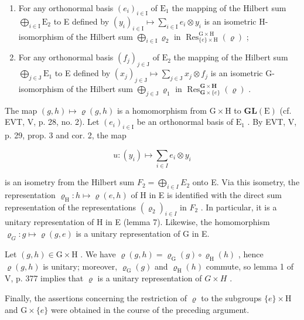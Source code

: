 \begin{enumerate}
\def\labelenumi{\alph{enumi})}
\setcounter{enumi}{1}
\item
  For any orthonormal basis \((e_i)_{i\in \mathrm{I}}\) of \(\mathrm{E}_1\) the mapping of the Hilbert sum \(\bigoplus_{i\in \mathrm{I}}\mathrm{E}_2\) to E defined by \((y_i)_{i\in \mathrm{I}}\mapsto \sum_{i\in \mathrm{I}}e_i\otimes y_i\) is an isometric H-isomorphism of the Hilbert sum \(\bigoplus_{i\in \mathrm{I}}\varrho_2\) in \(\operatorname {Res}_{\{e\} \times \mathrm{H}}^{\mathrm{G}\times \mathrm{H}}(\varrho)\) ;
\item
  For any orthonormal basis \((f_j)_{j\in \mathrm{J}}\) of \(\mathrm{E}_2\) the mapping of the Hilbert sum \(\bigoplus_{j\in \mathrm{J}}\mathrm{E}_1\) to E defined by \((x_{j})_{j\in \mathrm{J}}\mapsto \sum_{j\in \mathrm{J}}x_{j}\otimes f_{j}\) is an isometric G-isomorphism of the Hilbert sum \(\bigoplus_{j\in \mathrm{J}}\varrho_1\) in \(\operatorname {Res}_{\mathbf{G}\times \{e\}}^{\mathbf{G}\times \mathbf{H}}(\varrho)\) .
\end{enumerate}

The map \((g,h)\mapsto\varrho(g,h)\) is a homomorphism from \(\mathrm{G}\times\mathrm{H}\) to \(\mathbf{GL}(\mathrm{E})\) (cf. EVT, V, p. 28, no. 2). Let \((e_{i})_{i\in\mathrm{I}}\) be an orthonormal basis of \(\mathrm{E}_{1}\) . By EVT, V, p. 29, prop. 3 and cor. 2, the map

\[
u \colon (y _ {i}) \mapsto \sum_ {i \in I} e _ {i} \otimes y _ {i}
\]

is an isometry from the Hilbert sum \(F_{2} = \bigoplus_{i \in I} E_{2}\) onto E. Via this isometry, the representation \(\varrho_{\mathrm{H}} \colon h \mapsto \varrho(e, h)\) of H in E is identified with the direct sum representation of the representations \((\varrho_{2})_{i\in I}\) in \(F_{2}\) . In particular, it is a unitary representation of H in E (lemma 7). Likewise, the homomorphism \(\varrho_{G}: g \mapsto \varrho(g,e)\) is a unitary representation of G in E.

Let \((g,h)\in\mathrm{G}\times\mathrm{H}\) . We have \(\varrho(g,h)=\varrho_{\mathrm{G}}(g)\circ\varrho_{\mathrm{H}}(h)\) , hence \(\varrho(g,h)\) is unitary; moreover, \(\varrho_{\mathrm{G}}(g)\) and \(\varrho_{\mathrm{H}}(h)\) commute, so lemma 1 of V, p. 377 implies that \(\varrho\) is a unitary representation of \(G\times H\) .

Finally, the assertions concerning the restriction of \(\varrho\) to the subgroups \(\{e\} \times \mathrm{H}\) and \(\mathrm{G} \times \{e\}\) were obtained in the course of the preceding argument.

